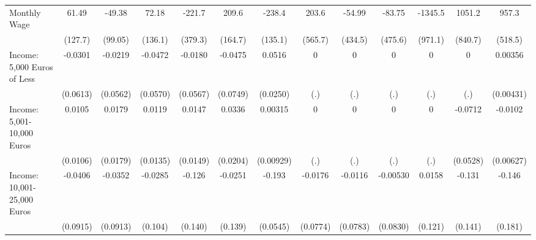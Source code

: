 {\begin{tabular}{l*{12}{c}}
\addlinespace
Monthly Wage&       61.49         &      -49.38         &       72.18         &      -221.7         &       209.6         &      -238.4         &       203.6         &      -54.99         &      -83.75         &     -1345.5         &      1051.2         &       957.3         \\
            &     (127.7)         &     (99.05)         &     (136.1)         &     (379.3)         &     (164.7)         &     (135.1)         &     (565.7)         &     (434.5)         &     (475.6)         &     (971.1)         &     (840.7)         &     (518.5)         \\
\addlinespace
Income: 5,000 Euros of Less&     -0.0301         &     -0.0219         &     -0.0472         &     -0.0180         &     -0.0475         &      0.0516\sym{*}  &           0         &           0         &           0         &           0         &           0         &     0.00356         \\
            &    (0.0613)         &    (0.0562)         &    (0.0570)         &    (0.0567)         &    (0.0749)         &    (0.0250)         &         (.)         &         (.)         &         (.)         &         (.)         &         (.)         &   (0.00431)         \\
\addlinespace
Income: 5,001-10,000 Euros&      0.0105         &      0.0179         &      0.0119         &      0.0147         &      0.0336         &     0.00315         &           0         &           0         &           0         &           0         &     -0.0712         &     -0.0102         \\
            &    (0.0106)         &    (0.0179)         &    (0.0135)         &    (0.0149)         &    (0.0204)         &   (0.00929)         &         (.)         &         (.)         &         (.)         &         (.)         &    (0.0528)         &   (0.00627)         \\
\addlinespace
Income: 10,001-25,000 Euros&     -0.0406         &     -0.0352         &     -0.0285         &      -0.126         &     -0.0251         &      -0.193\sym{***}&     -0.0176         &     -0.0116         &    -0.00530         &      0.0158         &      -0.131         &      -0.146         \\
            &    (0.0915)         &    (0.0913)         &     (0.104)         &     (0.140)         &     (0.139)         &    (0.0545)         &    (0.0774)         &    (0.0783)         &    (0.0830)         &     (0.121)         &     (0.141)         &     (0.181)         \\

\end{tabular}}
